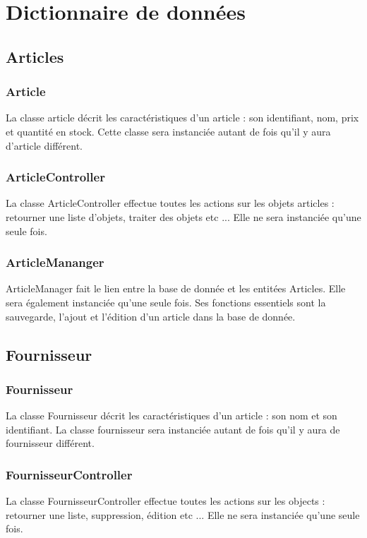 \section{Dictionnaire de données}

\subsection{Articles}

\subsubsection{Article}
La classe article décrit les caractéristiques d'un article : son identifiant, nom, prix et quantité en stock.
Cette classe sera instanciée autant de fois qu'il y aura d'article différent.

\subsubsection{ArticleController}
La classe ArticleController effectue toutes les actions sur les objets articles : retourner une liste d'objets, traiter des objets etc ...
 Elle ne sera instanciée qu'une seule fois.
 
\subsubsection{ArticleMananger}
ArticleManager fait le lien entre la base de donnée et les entitées Articles. Elle sera également instanciée qu'une seule fois. Ses fonctions essentiels sont la sauvegarde, l'ajout et l'édition d'un article dans la base de donnée.

\subsection{Fournisseur}

\subsubsection{Fournisseur}
La classe Fournisseur décrit les caractéristiques d'un article : son nom et son identifiant. La classe fournisseur sera instanciée autant de fois qu'il y aura de fournisseur différent.

\subsubsection{FournisseurController}
La classe FournisseurController effectue toutes les actions sur les objects : retourner une liste, suppression, édition etc ...
Elle ne sera instanciée qu'une seule fois.

